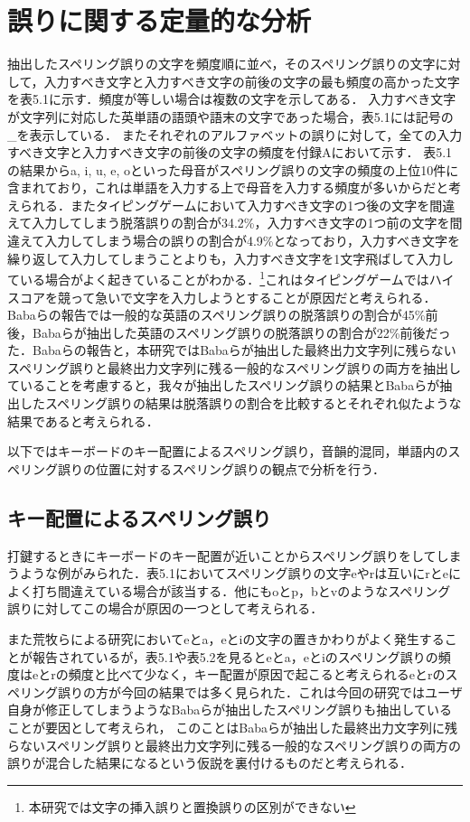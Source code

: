 \section{誤りに関する定量的な分析}
抽出したスペリング誤りの文字を頻度順に並べ，そのスペリング誤りの文字に対して，入力すべき文字と入力すべき文字の前後の文字の最も頻度の高かった文字を表5.1に示す．頻度が等しい場合は複数の文字を示してある．
入力すべき文字が文字列に対応した英単語の語頭や語末の文字であった場合，表5.1には記号の\_を表示している．
またそれぞれのアルファベットの誤りに対して，全ての入力すべき文字と入力すべき文字の前後の文字の頻度を付録Aにおいて示す．
表5.1の結果からa, i, u, e, oといった母音がスペリング誤りの文字の頻度の上位10件に含まれており，これは単語を入力する上で母音を入力する頻度が多いからだと考えられる．またタイピングゲームにおいて入力すべき文字の1つ後の文字を間違えて入力してしまう脱落誤りの割合が34.2\%，入力すべき文字の1つ前の文字を間違えて入力してしまう場合の誤りの割合が4.9\%となっており，入力すべき文字を繰り返して入力してしまうことよりも，入力すべき文字を1文字飛ばして入力している場合がよく起きていることがわかる．\footnote{本研究では文字の挿入誤りと置換誤りの区別ができない}これはタイピングゲームではハイスコアを競って急いで文字を入力しようとすることが原因だと考えられる．
Babaらの報告\cite{babaACL2012}では一般的な英語のスペリング誤りの脱落誤りの割合が45\%前後，Babaらが抽出した英語のスペリング誤りの脱落誤りの割合が22\%前後だった．Babaらの報告と，本研究ではBabaらが抽出した最終出力文字列に残らないスペリング誤りと最終出力文字列に残る一般的なスペリング誤りの両方を抽出していることを考慮すると，我々が抽出したスペリング誤りの結果とBabaらが抽出したスペリング誤りの結果は脱落誤りの割合を比較するとそれぞれ似たような結果であると考えられる．

以下ではキーボードのキー配置によるスペリング誤り，音韻的混同，単語内のスペリング誤りの位置に対するスペリング誤りの観点で分析を行う．

\subsection{キー配置によるスペリング誤り}
打鍵するときにキーボードのキー配置が近いことからスペリング誤りをしてしまうような例がみられた．表5.1においてスペリング誤りの文字eやrは互いにrとeによく打ち間違えている場合が該当する．他にもoとp，bとvのようなスペリング誤りに対してこの場合が原因の一つとして考えられる．

また荒牧らによる研究\cite{aramakiNLP2010}においてeとa，eとiの文字の置きかわりがよく発生することが報告されているが，表5.1や表5.2を見るとeとa，eとiのスペリング誤りの頻度はeとrの頻度と比べて少なく，キー配置が原因で起こると考えられるeとrのスペリング誤りの方が今回の結果では多く見られた．これは今回の研究ではユーザ自身が修正してしまうようなBabaらが抽出したスペリング誤り\cite{babaACL2012}も抽出していることが要因として考えられ，
このことはBabaらが抽出した最終出力文字列に残らないスペリング誤りと最終出力文字列に残る一般的なスペリング誤りの両方の誤りが混合した結果になるという仮説を裏付けるものだと考えられる．

